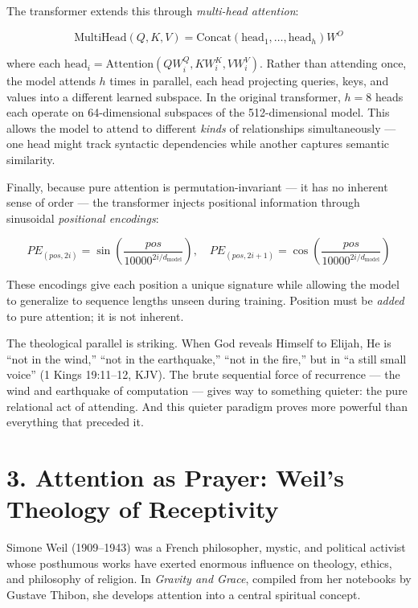 \documentclass[10pt, letterpaper, twocolumn]{article}
\begin{document}
The transformer extends this through \emph{multi-head attention}:

\[\text{MultiHead}(Q, K, V) = \text{Concat}(\text{head}_1, \dots, \text{head}_h)W^O\]

where each \(\text{head}_i = \text{Attention}(QW_i^Q, KW_i^K, VW_i^V)\). Rather than attending once, the model attends \(h\) times in parallel, each head projecting queries, keys, and values into a different learned subspace. In the original transformer, \(h = 8\) heads each operate on 64-dimensional subspaces of the 512-dimensional model. This allows the model to attend to different \emph{kinds} of relationships simultaneously --- one head might track syntactic dependencies while another captures semantic similarity.

Finally, because pure attention is permutation-invariant --- it has no inherent sense of order --- the transformer injects positional information through sinusoidal \emph{positional encodings}:

\[PE_{(pos, 2i)} = \sin\left(\frac{pos}{10000^{2i/d_{\text{model}}}}\right), \quad PE_{(pos, 2i+1)} = \cos\left(\frac{pos}{10000^{2i/d_{\text{model}}}}\right)\]

These encodings give each position a unique signature while allowing the model to generalize to sequence lengths unseen during training. Position must be \emph{added} to pure attention; it is not inherent.

The theological parallel is striking. When God reveals Himself to Elijah, He is ``not in the wind,'' ``not in the earthquake,'' ``not in the fire,'' but in ``a still small voice'' (1 Kings 19:11--12, KJV). The brute sequential force of recurrence --- the wind and earthquake of computation --- gives way to something quieter: the pure relational act of attending. And this quieter paradigm proves more powerful than everything that preceded it.

\section*{3. Attention as Prayer: Weil's Theology of Receptivity}\label{attention-as-prayer-weils-theology-of-receptivity}

Simone Weil (1909--1943) was a French philosopher, mystic, and political activist whose posthumous works have exerted enormous influence on theology, ethics, and philosophy of religion. In \emph{Gravity and Grace}, compiled from her notebooks by Gustave Thibon, she develops attention into a central spiritual concept.
\end{document}
